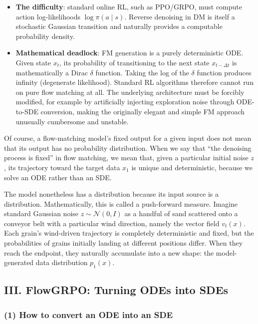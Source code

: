 \begin{itemize}
\tightlist
\item
  \textbf{The difficulty}: standard online RL, such as PPO/GRPO, must compute action log-likelihoods \(\log\pi(a\mid s)\). Reverse denoising in DM is itself a stochastic Gaussian transition and naturally provides a computable probability density.
\item
  \textbf{Mathematical deadlock}: FM generation is a purely deterministic ODE. Given state \(x_t\), its probability of transitioning to the next state \(x_{t-\Delta t}\) is mathematically a Dirac \(\delta\) function. Taking the log of the \(\delta\) function produces infinity (degenerate likelihood). Standard RL algorithms therefore cannot run on pure flow matching at all. The underlying architecture must be forcibly modified, for example by artificially injecting exploration noise through ODE-to-SDE conversion, making the originally elegant and simple FM approach unusually cumbersome and unstable.
\end{itemize}

Of course, a flow-matching model's fixed output for a given input does not mean that its output has no probability distribution. When we say that ``the denoising process is fixed'' in flow matching, we mean that, given a particular initial noise \(z\), its trajectory toward the target data \(x_1\) is unique and deterministic, because we solve an ODE rather than an SDE.

The model nonetheless has a distribution because its input source is a distribution. Mathematically, this is called a push-forward measure. Imagine standard Gaussian noise \(z\sim\mathcal{N}(0,I)\) as a handful of sand scattered onto a conveyor belt with a particular wind direction, namely the vector field \(v_t(x)\). Each grain's wind-driven trajectory is completely deterministic and fixed, but the probabilities of grains initially landing at different positions differ. When they reach the endpoint, they naturally accumulate into a new shape: the model-generated data distribution \(p_1(x)\).

\hypertarget{iii.-flowgrpo-turning-odes-into-sdes}{%
\subsection{III. FlowGRPO: Turning ODEs into SDEs}\label{iii.-flowgrpo-turning-odes-into-sdes}}

\hypertarget{how-to-convert-an-ode-into-an-sde}{%
\subsubsection{(1) How to convert an ODE into an SDE}\label{how-to-convert-an-ode-into-an-sde}}

